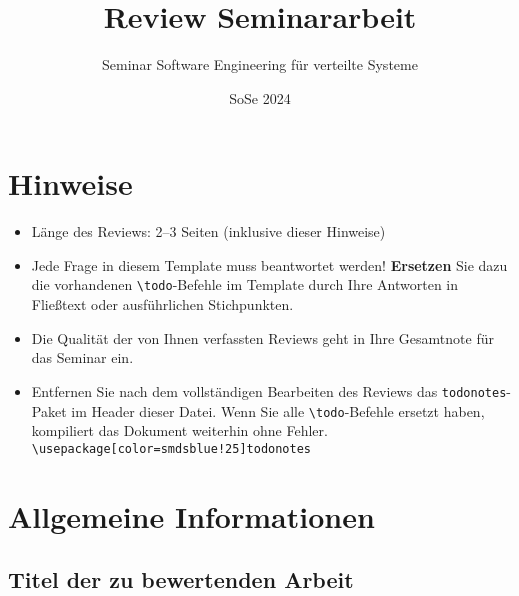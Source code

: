 \documentclass[a4paper,DIV=16]{scrartcl}
\begin{document}
\title{Review Seminararbeit}
\date{SoSe 2024}

\subtitle{Seminar Software Engineering für verteilte Systeme}

\author{}

\maketitle
\thispagestyle{empty}

\section*{Hinweise}
\begin{itemize}
\item Länge des Reviews: 2--3 Seiten (inklusive dieser Hinweise)
\item Jede Frage in diesem Template muss beantwortet werden! \textbf{Ersetzen}
Sie dazu die vorhandenen \texttt{\textbackslash{}todo}-Befehle im Template durch
Ihre Antworten in Fließtext oder ausführlichen Stichpunkten.
\item Die Qualität der von Ihnen verfassten Reviews geht in Ihre Gesamtnote für
das Seminar ein.
\item Entfernen Sie nach dem vollständigen Bearbeiten des Reviews das
\texttt{todonotes}-Paket im Header dieser Datei. Wenn Sie alle
\texttt{\textbackslash{}todo}-Befehle ersetzt haben, kompiliert das Dokument
weiterhin ohne Fehler.
\texttt{\textbackslash{}usepackage[color=smdsblue!25]{todonotes}}
\end{itemize}

\section*{Allgemeine Informationen}
\subsection*{Titel der zu bewertenden Arbeit}
\end{document}
